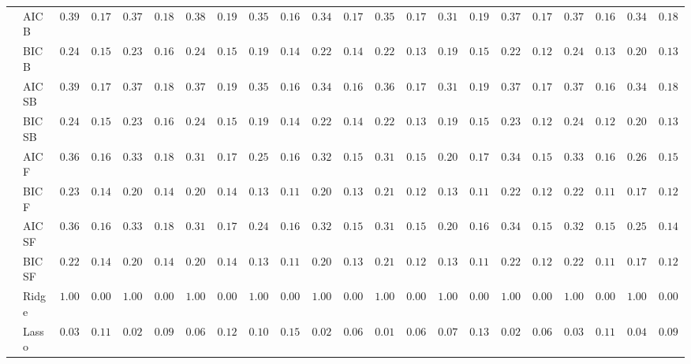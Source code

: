 \begin{tabular}{p{0.2cm}p{1cm}|p{0.6cm}p{0.6cm}|p{0.6cm}p{0.6cm}p{0.6cm}p{0.6cm}p{0.6cm}p{0.6cm}|p{0.6cm}p{0.6cm}p{0.6cm}p{0.6cm}p{0.6cm}p{0.6cm}|p{0.6cm}p{0.6cm}p{0.6cm}p{0.6cm}p{0.6cm}p{0.6cm}}
 & AIC B  & $0.3900$ & $0.1792$ & $0.3733$ & $0.1852$ & $0.3800$ & $0.1969$ & $0.3500$ & $0.1633$ & $0.3433$ & $0.1705$ & $0.3583$ & $0.1794$ & $0.3150$ & $0.1995$ & $0.3750$ & $0.1731$ & $0.3750$ & $0.1681$ & $0.3450$ & $0.1854$ \\
 & BIC B  & $0.2433$ & $0.1525$ & $0.2317$ & $0.1690$ & $0.2450$ & $0.1544$ & $0.1900$ & $0.1441$ & $0.2200$ & $0.1419$ & $0.2217$ & $0.1320$ & $0.1933$ & $0.1548$ & $0.2267$ & $0.1287$ & $0.2417$ & $0.1306$ & $0.2083$ & $0.1369$ \\
 & AIC SB  & $0.3933$ & $0.1797$ & $0.3733$ & $0.1852$ & $0.3783$ & $0.1994$ & $0.3500$ & $0.1633$ & $0.3467$ & $0.1686$ & $0.3617$ & $0.1758$ & $0.3150$ & $0.1995$ & $0.3767$ & $0.1702$ & $0.3750$ & $0.1681$ & $0.3450$ & $0.1854$ \\
 & BIC SB  & $0.2433$ & $0.1525$ & $0.2317$ & $0.1690$ & $0.2450$ & $0.1544$ & $0.1917$ & $0.1448$ & $0.2217$ & $0.1403$ & $0.2233$ & $0.1302$ & $0.1950$ & $0.1554$ & $0.2300$ & $0.1293$ & $0.2433$ & $0.1285$ & $0.2083$ & $0.1369$ \\
 & AIC F  & $0.3617$ & $0.1693$ & $0.3333$ & $0.1820$ & $0.3183$ & $0.1742$ & $0.2500$ & $0.1667$ & $0.3233$ & $0.1532$ & $0.3183$ & $0.1519$ & $0.2083$ & $0.1747$ & $0.3417$ & $0.1505$ & $0.3317$ & $0.1615$ & $0.2600$ & $0.1595$ \\
 & BIC F  & $0.2300$ & $0.1437$ & $0.2083$ & $0.1467$ & $0.2067$ & $0.1463$ & $0.1317$ & $0.1119$ & $0.2050$ & $0.1316$ & $0.2100$ & $0.1245$ & $0.1383$ & $0.1162$ & $0.2200$ & $0.1273$ & $0.2283$ & $0.1176$ & $0.1717$ & $0.1241$ \\
 & AIC SF  & $0.3617$ & $0.1676$ & $0.3333$ & $0.1820$ & $0.3150$ & $0.1739$ & $0.2483$ & $0.1650$ & $0.3217$ & $0.1503$ & $0.3167$ & $0.1526$ & $0.2017$ & $0.1646$ & $0.3417$ & $0.1505$ & $0.3233$ & $0.1586$ & $0.2550$ & $0.1488$ \\
 & BIC SF  & $0.2283$ & $0.1415$ & $0.2050$ & $0.1418$ & $0.2067$ & $0.1463$ & $0.1300$ & $0.1100$ & $0.2050$ & $0.1316$ & $0.2100$ & $0.1245$ & $0.1383$ & $0.1162$ & $0.2200$ & $0.1273$ & $0.2283$ & $0.1176$ & $0.1717$ & $0.1241$ \\
 & Ridge  & $1.0000$ & $0.0000$ & $1.0000$ & $0.0000$ & $1.0000$ & $0.0000$ & $1.0000$ & $0.0000$ & $1.0000$ & $0.0000$ & $1.0000$ & $0.0000$ & $1.0000$ & $0.0000$ & $1.0000$ & $0.0000$ & $1.0000$ & $0.0000$ & $1.0000$ & $0.0000$ \\
 & Lasso  & $0.0300$ & $0.1193$ & $0.0217$ & $0.0907$ & $0.0600$ & $0.1220$ & $0.1000$ & $0.1553$ & $0.0217$ & $0.0655$ & $0.0183$ & $0.0666$ & $0.0700$ & $0.1385$ & $0.0217$ & $0.0611$ & $0.0367$ & $0.1100$ & $0.0433$ & $0.0966$ \\

\end{tabular}
